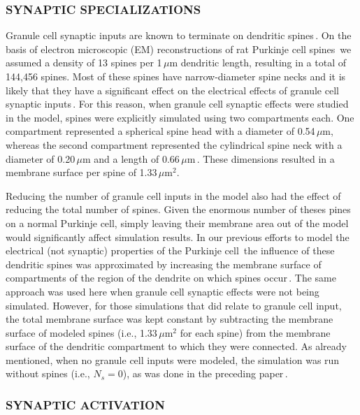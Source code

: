 \documentclass[12pt]{article}
\begin{document}
\subsubsection*{SYNAPTIC SPECIALIZATIONS}

Granule cell synaptic inputs are known to terminate on dendritic spines\,\cite{Harvey:1991xz, Palay:1974fk}.
On the basis of electron microscopic (EM) reconstructions of rat Purkinje cell spines\,\cite{M:1988bh} we assumed a density of 13 spines per 1\,$\mu$m dendritic length, resulting in a total of 144,456 spines. Most of these spines have narrow-diameter spine necks and it is likely that they have a significant effect on the electrical effects of granule cell synaptic inputs\,\cite{Rall:1990tg}. For this reason, when granule cell synaptic effects were studied in the model, spines were explicitly simulated using two compartments each. One compartment represented a spherical spine head with a diameter of 0.54\,$\mu$m, whereas the second compartment represented the cylindrical spine neck with a diameter of 0.20\,$\mu$m and a length of 0.66\,$\mu$m\,\cite{M:1988bh}. These dimensions resulted in a membrane surface per spine of 1.33\,$\mu$m$^2$.

Reducing the number of granule cell inputs in the model also had the effect of reducing the total number of spines. Given the enormous number of theses pines on a normal Purkinje cell, simply leaving their membrane area out of the model would significantly affect simulation results. In our previous efforts to model the electrical (not synaptic) properties of the Purkinje cell\,\cite{deschutter94:_purkin_i} the influence of these dendritic spines was approximated by increasing the membrane surface of compartments of the region of the dendrite on which spines occur\,\cite{R:1989cr, Jaslove:1992fu, Jaslove:1992fu}. The same approach was used here when granule cell synaptic effects were not being simulated. However, for those simulations that did relate to granule cell input, the total membrane surface was kept constant by subtracting the membrane surface of modeled spines (i.e., 1.33\,$\mu$m$^2$ for each spine) from the membrane surface of the dendritic compartment to which they were connected. As already mentioned, when no granule cell inputs were modeled, the simulation was run without spines (i.e., $N_s = 0$), as was done in the preceding paper\,\cite{deschutter94:_purkin_i}.

\subsubsection*{SYNAPTIC ACTIVATION}
\end{document}
